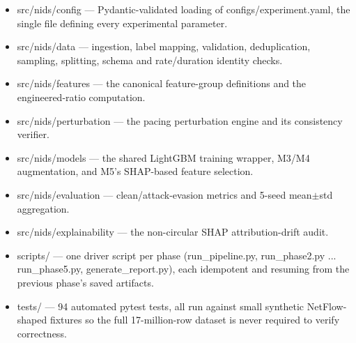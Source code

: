 \documentclass[12pt,a4paper]{report}
\begin{document}
\begin{itemize}\setlength\itemsep{2pt}\item src/nids/config --- Pydantic-validated loading of configs/experiment.yaml, the single file defining every experimental parameter.\end{itemize}
\begin{itemize}\setlength\itemsep{2pt}\item src/nids/data --- ingestion, label mapping, validation, deduplication, sampling, splitting, schema and rate/duration identity checks.\end{itemize}
\begin{itemize}\setlength\itemsep{2pt}\item src/nids/features --- the canonical feature-group definitions and the engineered-ratio computation.\end{itemize}
\begin{itemize}\setlength\itemsep{2pt}\item src/nids/perturbation --- the pacing perturbation engine and its consistency verifier.\end{itemize}
\begin{itemize}\setlength\itemsep{2pt}\item src/nids/models --- the shared LightGBM training wrapper, M3/M4 augmentation, and M5's SHAP-based feature selection.\end{itemize}
\begin{itemize}\setlength\itemsep{2pt}\item src/nids/evaluation --- clean/attack-evasion metrics and 5-seed mean$\pm$std aggregation.\end{itemize}
\begin{itemize}\setlength\itemsep{2pt}\item src/nids/explainability --- the non-circular SHAP attribution-drift audit.\end{itemize}
\begin{itemize}\setlength\itemsep{2pt}\item scripts/ --- one driver script per phase (run\_pipeline.py, run\_phase2.py ... run\_phase5.py, generate\_report.py), each idempotent and resuming from the previous phase's saved artifacts.\end{itemize}
\begin{itemize}\setlength\itemsep{2pt}\item tests/ --- 94 automated pytest tests, all run against small synthetic NetFlow-shaped fixtures so the full 17-million-row dataset is never required to verify correctness.\end{itemize}
\end{document}
